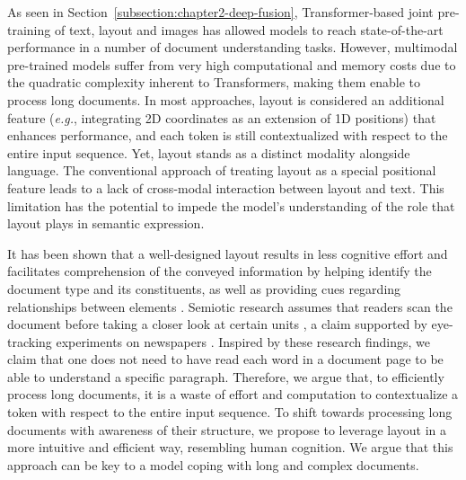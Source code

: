 As seen in Section~\ref{subsection:chapter2-deep-fusion}, Transformer-based joint pre-training of text, layout and images has allowed models to reach state-of-the-art performance in a number of document understanding tasks. However, multimodal pre-trained models suffer from very high computational and memory costs due to the quadratic complexity inherent to Transformers, making them enable to process long documents. In most approaches, layout is considered an additional feature (\textit{e.g.}, integrating 2D coordinates as an extension of 1D positions) that enhances performance, and each token is still contextualized with respect to the entire input sequence. Yet, layout stands as a distinct modality alongside language. The conventional approach of treating layout as a special positional feature leads to a lack of cross-modal interaction between layout and text. This limitation has the potential to impede the model's understanding of the role that layout plays in semantic expression.

It has been shown that a well-designed layout results in less cognitive effort \citep{britton1982effects, olive2017processing} and facilitates comprehension of the conveyed information by helping identify the document type and its constituents, as well as providing cues regarding relationships between elements \citep{wright1999psychology}. Semiotic research assumes that readers scan the document before taking a closer look at certain units \citep{kress1996reading}, a claim supported by eye-tracking experiments on newspapers \citep{leckner2012presentation}.  Inspired by these research findings, we claim that one does not need to have read each word in a document page to be able to understand a specific paragraph. Therefore, we argue that, to efficiently process long documents, it is a waste of effort and computation to contextualize a token with respect to the entire input sequence. To shift towards processing long documents with awareness of their structure, we propose to leverage layout in a more intuitive and efficient way, resembling human cognition. We argue that this approach can be key to a model coping with long and complex documents.

